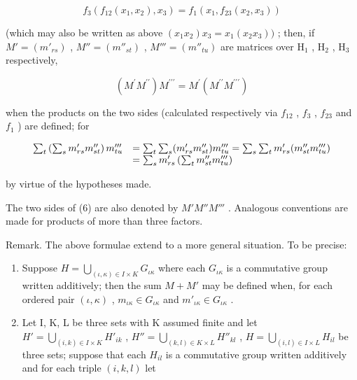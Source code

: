 \[
f _ {3} (f _ {1 2} (x _ {1}, x _ {2}), x _ {3}) = f _ {1} (x _ {1}, f _ {2 3} (x _ {2}, x _ {3}))
\]

(which may also be written as above \((x_{1}x_{2})x_{3} = x_{1}(x_{2}x_{3}))\) ; then, if \(M' = (m'_{rs})\) , \(M'' = (m''_{st})\) , \(M''' = (m''_{tu})\) are matrices over \(\mathrm{H}_1\) , \(\mathrm{H}_2\) , \(\mathrm{H}_3\) respectively,

\[
(M ^ {\prime} M ^ {\prime \prime}) M ^ {\prime \prime \prime} = M ^ {\prime} (M ^ {\prime \prime} M ^ {\prime \prime \prime})\tag{6}
\]

when the products on the two sides (calculated respectively via \(f_{12}\) , \(f_{3}\) , \(f_{23}\) and \(f_{1}\) ) are defined; for

\[
\begin{array}{r l} \sum_ {t} \left(\sum_ {s} m _ {r s} ^ {\prime} m _ {s t} ^ {\prime \prime}\right) m _ {t u} ^ {\prime \prime \prime} & = \sum_ {t} \sum_ {s} (m _ {r s} ^ {\prime} m _ {s t} ^ {\prime \prime}) m _ {t u} ^ {\prime \prime \prime} = \sum_ {s} \sum_ {t} m _ {r s} ^ {\prime} (m _ {s t} ^ {\prime \prime} m _ {t u} ^ {\prime \prime \prime}) \\ & = \sum_ {s} m _ {r s} ^ {\prime} \left(\sum_ {t} m _ {s t} ^ {\prime \prime} m _ {t u} ^ {\prime \prime \prime}\right) \end{array}
\]

by virtue of the hypotheses made.

The two sides of (6) are also denoted by \(M'M''M'''\) . Analogous conventions are made for products of more than three factors.

Remark. The above formulae extend to a more general situation. To be precise:

\begin{enumerate}
\def\labelenumi{(\alph{enumi})}
\item
  Suppose \(H = \bigcup_{(\iota, \kappa) \in I \times K} G_{\iota\kappa}\) where each \(G_{\iota\kappa}\) is a commutative group written additively; then the sum \(M + M'\) may be defined when, for each ordered pair \((\iota, \kappa)\) , \(m_{\iota\kappa} \in G_{\iota\kappa}\) and \(m'_{\iota\kappa} \in G_{\iota\kappa}\) .
\item
  Let I, K, L be three sets with K assumed finite and let \(H' = \bigcup_{(i, k) \in I \times K} H'_{ik}\) , \(H'' = \bigcup_{(k, l) \in K \times L} H''_{kl}\) , \(H = \bigcup_{(i, l) \in I \times L} H_{il}\) be three sets; suppose that each \(H_{il}\) is a commutative group written additively and for each triple \((i, k, l)\) let
\end{enumerate}

